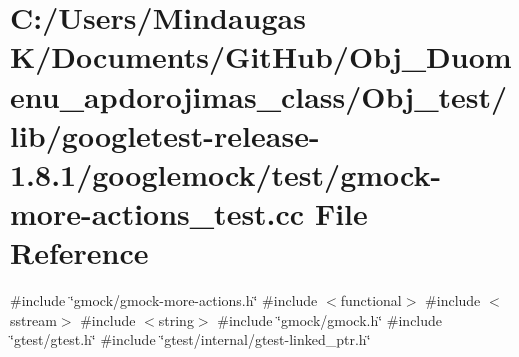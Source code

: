 \hypertarget{_obj__test_2lib_2googletest-release-1_88_81_2googlemock_2test_2gmock-more-actions__test_8cc}{}\section{C\+:/\+Users/\+Mindaugas K/\+Documents/\+Git\+Hub/\+Obj\+\_\+\+Duomenu\+\_\+apdorojimas\+\_\+class/\+Obj\+\_\+test/lib/googletest-\/release-\/1.8.1/googlemock/test/gmock-\/more-\/actions\+\_\+test.cc File Reference}
\label{_obj__test_2lib_2googletest-release-1_88_81_2googlemock_2test_2gmock-more-actions__test_8cc}
{\ttfamily \#include \char`\"{}gmock/gmock-\/more-\/actions.\+h\char`\"{}}\newline
{\ttfamily \#include $<$functional$>$}\newline
{\ttfamily \#include $<$sstream$>$}\newline
{\ttfamily \#include $<$string$>$}\newline
{\ttfamily \#include \char`\"{}gmock/gmock.\+h\char`\"{}}\newline
{\ttfamily \#include \char`\"{}gtest/gtest.\+h\char`\"{}}\newline
{\ttfamily \#include \char`\"{}gtest/internal/gtest-\/linked\+\_\+ptr.\+h\char`\"{}}\newline
